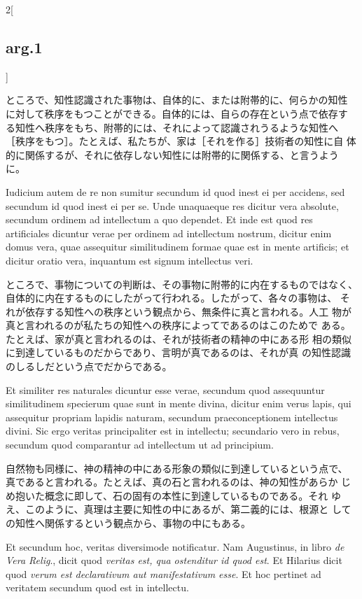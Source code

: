 \documentclass[paper=a4paper,fontsize=10pt,jafontsize=9pt,titlepage]{jlreq}
\begin{document}
\begin{paracol}{2}[\subsection{arg.1}]
\switchcolumn

ところで、知性認識された事物は、自体的に、または附帯的に、何らかの知性
に対して秩序をもつことができる。自体的には、自らの存在という点で依存す
る知性へ秩序をもち、附帯的には、それによって認識されうるような知性へ
［秩序をもつ］。たとえば、私たちが、家は［それを作る］技術者の知性に自
体的に関係するが、それに依存しない知性には附帯的に関係する、と言うよう
に。

\switchcolumn*


Iudicium autem de re non sumitur secundum id quod inest ei per
accidens, sed secundum id quod inest ei per se. Unde unaquaeque res
dicitur vera absolute, secundum ordinem ad intellectum a quo
dependet. Et inde est quod res artificiales dicuntur verae per ordinem
ad intellectum nostrum, dicitur enim domus vera, quae assequitur
similitudinem formae quae est in mente artificis; et dicitur oratio
vera, inquantum est signum intellectus veri.

\switchcolumn

ところで、事物についての判断は、その事物に附帯的に内在するものではなく、
 自体的に内在するものにしたがって行われる。したがって、各々の事物は、
 それが依存する知性への秩序という観点から、無条件に真と言われる。人工
 物が真と言われるのが私たちの知性への秩序によってであるのはこのためで
 ある。たとえば、家が真と言われるのは、それが技術者の精神の中にある形
 相の類似に到達しているものだからであり、言明が真であるのは、それが真
 の知性認識のしるしだという点でだからである。

\switchcolumn*


Et similiter res naturales dicuntur esse verae, secundum quod
assequuntur similitudinem specierum quae sunt in mente divina, dicitur
enim verus lapis, qui assequitur propriam lapidis naturam, secundum
praeconceptionem intellectus divini. Sic ergo veritas principaliter
est in intellectu; secundario vero in rebus, secundum quod comparantur
ad intellectum ut ad principium.

\switchcolumn

自然物も同様に、神の精神の中にある形象の類似に到達しているという点で、
 真であると言われる。たとえば、真の石と言われるのは、神の知性があらか
 じめ抱いた概念に即して、石の固有の本性に到達しているものである。それ
 ゆえ、このように、真理は主要に知性の中にあるが、第二義的には、根源と
 しての知性へ関係するという観点から、事物の中にもある。

\switchcolumn*


\hspace{1em}Et secundum hoc, veritas diversimode notificatur. Nam
Augustinus, in libro {\itshape de Vera Relig}., dicit quod {\itshape
veritas est, qua ostenditur id quod est}. Et Hilarius dicit quod
{\itshape verum est declarativum aut manifestativum esse}. Et hoc
pertinet ad veritatem secundum quod est in intellectu.


\end{paracol}
\end{document}
